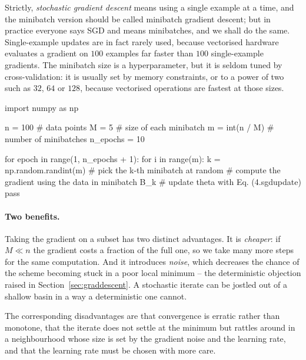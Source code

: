 Strictly, \emph{stochastic gradient descent} means using a single example at a
time, and the minibatch version should be called minibatch gradient descent;
but in practice everyone says SGD and means minibatches, and we shall do the
same.  Single-example updates are in fact rarely used, because vectorised
hardware evaluates a gradient on $100$ examples far faster than $100$
single-example gradients.  The minibatch size is a hyperparameter, but it is
seldom tuned by cross-validation: it is usually set by memory constraints, or
to a power of two such as $32$, $64$ or $128$, because vectorised operations
are fastest at those sizes.

\begin{Python}{}
import numpy as np

n = 100            # data points
M = 5              # size of each minibatch
m = int(n / M)     # number of minibatches
n_epochs = 10

for epoch in range(1, n_epochs + 1):
    for i in range(m):
        k = np.random.randint(m)     # pick the k-th minibatch at random
        # compute the gradient using the data in minibatch B_k
        # update theta with Eq. (4.sgdupdate)
        pass
\end{Python}

\paragraph{Two benefits.}
Taking the gradient on a subset has two distinct advantages.  It is
\emph{cheaper}: if $M\ll n$ the gradient costs a fraction of the full one, so
we take many more steps for the same computation.  And it introduces
\emph{noise}, which decreases the chance of the scheme becoming stuck in a
poor local minimum -- the deterministic objection raised in
Section~\ref{sec:graddescent}.  A stochastic iterate can be jostled out of a
shallow basin in a way a deterministic one cannot.

The corresponding disadvantages are that convergence is erratic rather than
monotone, that the iterate does not settle at the minimum but rattles around
in a neighbourhood whose size is set by the gradient noise and the learning
rate, and that the learning rate must be chosen with more care.


